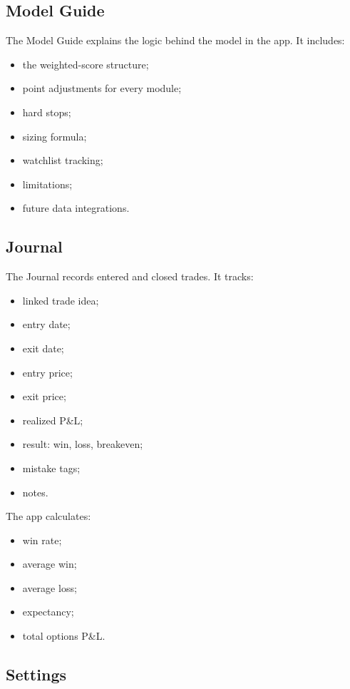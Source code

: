 \documentclass[11pt]{article}
\begin{document}
\subsection{Model Guide}

The Model Guide explains the logic behind the model in the app. It includes:

\begin{itemize}[noitemsep]
  \item the weighted-score structure;
  \item point adjustments for every module;
  \item hard stops;
  \item sizing formula;
  \item watchlist tracking;
  \item limitations;
  \item future data integrations.
\end{itemize}

\subsection{Journal}

The Journal records entered and closed trades. It tracks:

\begin{itemize}[noitemsep]
  \item linked trade idea;
  \item entry date;
  \item exit date;
  \item entry price;
  \item exit price;
  \item realized P\&L;
  \item result: win, loss, breakeven;
  \item mistake tags;
  \item notes.
\end{itemize}

The app calculates:

\begin{itemize}[noitemsep]
  \item win rate;
  \item average win;
  \item average loss;
  \item expectancy;
  \item total options P\&L.
\end{itemize}

\subsection{Settings}
\end{document}
